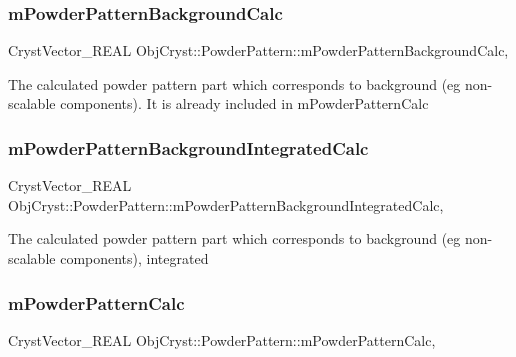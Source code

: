 \subsubsection{\texorpdfstring{mPowderPatternBackgroundCalc}{mPowderPatternBackgroundCalc}}
{\footnotesize\ttfamily Cryst\+Vector\+\_\+\+R\+E\+AL Obj\+Cryst\+::\+Powder\+Pattern\+::m\+Powder\+Pattern\+Background\+Calc\hspace{0.3cm}{\ttfamily [mutable]}, {\ttfamily [protected]}}

The calculated powder pattern part which corresponds to \textquotesingle{}background\textquotesingle{} (eg non-\/scalable components). It is already included in m\+Powder\+Pattern\+Calc \mbox{\label{class_obj_cryst_1_1_powder_pattern_a18da34aac86b27d5511268113b5f9260}} 
\subsubsection{\texorpdfstring{mPowderPatternBackgroundIntegratedCalc}{mPowderPatternBackgroundIntegratedCalc}}
{\footnotesize\ttfamily Cryst\+Vector\+\_\+\+R\+E\+AL Obj\+Cryst\+::\+Powder\+Pattern\+::m\+Powder\+Pattern\+Background\+Integrated\+Calc\hspace{0.3cm}{\ttfamily [mutable]}, {\ttfamily [protected]}}

The calculated powder pattern part which corresponds to \textquotesingle{}background\textquotesingle{} (eg non-\/scalable components), integrated \mbox{\label{class_obj_cryst_1_1_powder_pattern_a039c845ac70b5118f5090077a5ef7f70}} 
\subsubsection{\texorpdfstring{mPowderPatternCalc}{mPowderPatternCalc}}
{\footnotesize\ttfamily Cryst\+Vector\+\_\+\+R\+E\+AL Obj\+Cryst\+::\+Powder\+Pattern\+::m\+Powder\+Pattern\+Calc\hspace{0.3cm}{\ttfamily [mutable]}, {\ttfamily [protected]}}

